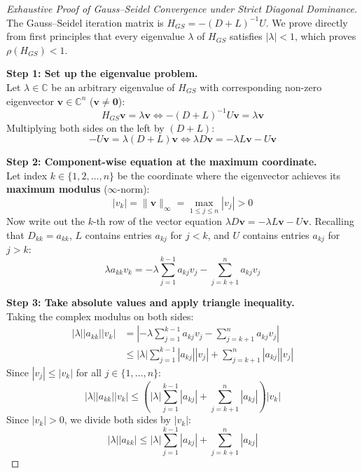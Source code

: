 \begin{proof}[Exhaustive Proof of Gauss--Seidel Convergence under Strict Diagonal Dominance]
The Gauss--Seidel iteration matrix is $H_{GS} = -(D + L)^{-1} U$. We prove directly from first principles that every eigenvalue $\lambda$ of $H_{GS}$ satisfies $|\lambda| < 1$, which proves $\rho(H_{GS}) < 1$.

\medskip
\noindent\textbf{Step 1: Set up the eigenvalue problem.} \\
Let $\lambda \in \mathbb{C}$ be an arbitrary eigenvalue of $H_{GS}$ with corresponding non-zero eigenvector $\mathbf{v} \in \mathbb{C}^n$ ($\mathbf{v} \ne \mathbf{0}$):
\begin{equation}
    H_{GS} \mathbf{v} = \lambda \mathbf{v} \iff -(D + L)^{-1} U \mathbf{v} = \lambda \mathbf{v}
\end{equation}
Multiplying both sides on the left by $(D + L)$:
\begin{equation}
    -U \mathbf{v} = \lambda (D + L) \mathbf{v} \iff \lambda D \mathbf{v} = -\lambda L \mathbf{v} - U \mathbf{v}
\end{equation}

\noindent\textbf{Step 2: Component-wise equation at the maximum coordinate.} \\
Let index $k \in \{1, 2, \dots, n\}$ be the coordinate where the eigenvector achieves its \textbf{maximum modulus} ($\infty$-norm):
\begin{equation}
    |v_k| = \|\mathbf{v}\|_\infty = \max_{1 \le j \le n} |v_j| > 0
\end{equation}
Now write out the $k$-th row of the vector equation $\lambda D \mathbf{v} = -\lambda L \mathbf{v} - U \mathbf{v}$. Recalling that $D_{kk} = a_{kk}$, $L$ contains entries $a_{kj}$ for $j < k$, and $U$ contains entries $a_{kj}$ for $j > k$:
\begin{equation}
    \lambda a_{kk} v_k = -\lambda \sum_{j=1}^{k-1} a_{kj} v_j - \sum_{j=k+1}^n a_{kj} v_j
\end{equation}

\noindent\textbf{Step 3: Take absolute values and apply triangle inequality.} \\
Taking the complex modulus on both sides:
\begin{align}
    |\lambda| |a_{kk}| |v_k| &= \left| -\lambda \sum_{j=1}^{k-1} a_{kj} v_j - \sum_{j=k+1}^n a_{kj} v_j \right| \nonumber \\
    &\le |\lambda| \sum_{j=1}^{k-1} |a_{kj}| |v_j| + \sum_{j=k+1}^n |a_{kj}| |v_j|
\end{align}
Since $|v_j| \le |v_k|$ for all $j \in \{1, \dots, n\}$:
\begin{equation}
    |\lambda| |a_{kk}| |v_k| \le \left( |\lambda| \sum_{j=1}^{k-1} |a_{kj}| + \sum_{j=k+1}^n |a_{kj}| \right) |v_k|
\end{equation}
Since $|v_k| > 0$, we divide both sides by $|v_k|$:
\begin{equation}
    |\lambda| |a_{kk}| \le |\lambda| \sum_{j=1}^{k-1} |a_{kj}| + \sum_{j=k+1}^n |a_{kj}|
\end{equation}


\end{proof}

